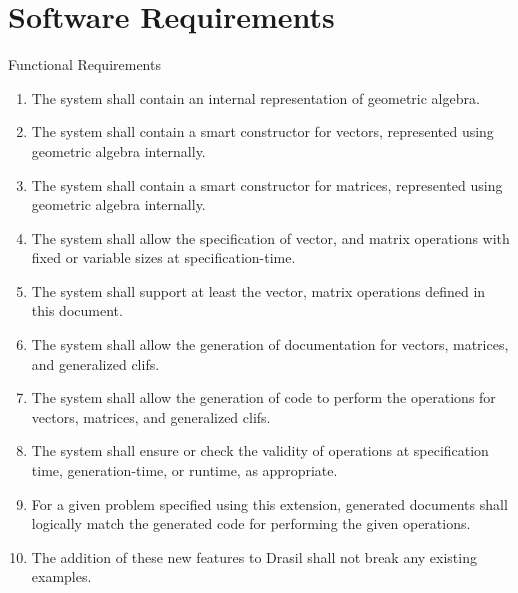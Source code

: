 \documentclass[aspectratio=169,xcolor=dvipsnames]{beamer}
\begin{document}
\section{Software Requirements}

\begin{frame}{Functional Requirements}
      \begin{enumerate}
\item<only@1> The system shall contain an internal representation of geometric algebra.
\item<only@1> The system shall contain a smart constructor for vectors, represented using
      geometric algebra internally.
\item<only@1> The system shall contain a smart constructor for matrices, represented using
      geometric algebra internally.
\item<only@1> The system shall allow the specification of vector, and
      matrix operations with fixed or variable sizes at specification-time.
\item<only@1> The system shall support at least the vector, matrix operations
      defined in this document.
\item<only@1> The system shall allow the generation of documentation for vectors, matrices,
      and generalized clifs.
\item<only@1> The system shall allow the generation of code to perform the operations
      for vectors, matrices, and generalized clifs.
\item<only@1> The system shall ensure or check the validity of operations at specification 
      time, generation-time, or runtime, as appropriate.
\item<only@2> For a given problem specified using this extension, generated documents shall 
      logically match the generated code for performing the given operations.
\item<only@2> The addition of these new features to Drasil shall not break any existing
      examples.
      \end{enumerate}
\end{frame}

\end{document}
